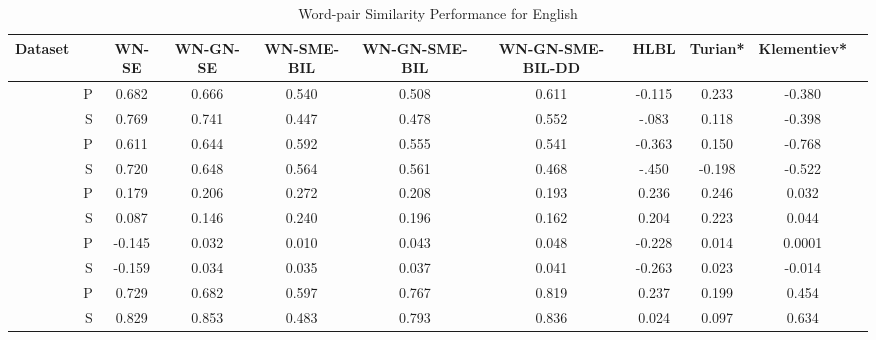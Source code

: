 \begin{table}[ht]
\caption{Word-pair Similarity Performance for English } %
\label{tbl:en-wp-sim}
\centering %
\tabcolsep=0.09cm

\begin{tabular}{cr c c c c c c c c c} 
\hline\hline %
 Dataset & & WN-SE  & WN-GN-SE & WN-SME-BIL &  WN-GN-SME-BIL & WN-GN-SME-BIL-DD &HLBL & Turian* & Klementiev*
\\ [0.5ex] 
\hline %
                                           &P&0.682&0.666&0.540&0.508&0.611&-0.115&0.233&-0.380 \\[-1ex]
\raisebox{1.5ex}{RubensteinGoodenough65}  &S&0.769&0.741&0.447&0.478&0.552&-.083&0.118&-0.398 \\[1ex]

                                     &  P &0.611&0.644&0.592&0.555&0.541&-0.363&0.150&-0.768 \\[-1ex]
\raisebox{1.5ex}{MillerCharles30}  &  S & 0.720&0.648&0.564&0.561&0.468&-.450&-0.198&-0.522 \\[1ex]

                                   &  P &0.179&0.206&0.272&0.208&0.193&0.236&0.246&0.032 \\[-1ex]
\raisebox{1.5ex}{Finkelstein353}  &  S &0.087&0.146&0.240&0.196&0.162&0.204&0.223&0.044 \\[1ex]

                                  &  P &-0.145&0.032&0.010&0.043&0.048&-0.228&0.014&0.0001 \\[-1ex]
\raisebox{1.5ex}{Szumlanski122}  &  S & -0.159&0.034&0.035&0.037&0.041&-0.263&0.023&-0.014 \\[1ex]

                                  &  P & 0.729&0.682&0.597&0.767&0.819&0.237&0.199&0.454 \\[-1ex]
\raisebox{1.5ex}{YangPowers130}  &  S & 0.829&0.853&0.483&0.793&0.836&0.024&0.097& 0.634 \\[1ex]

\hline %
     
          
 \hline %
\end{tabular}

\label{tab:en-wp-sim}
\end{table}      


